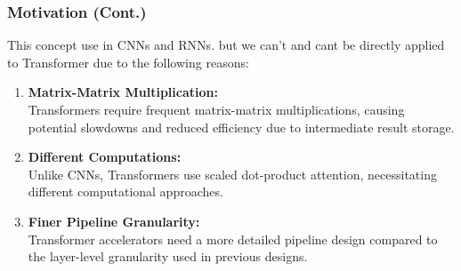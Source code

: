 \documentclass[
	12pt, %
]{beamer}
\begin{document}
\begin{frame}
	\frametitle{Motivation (Cont.)}
	
	This concept use in CNNs and RNNs. but we can't and cant be directly applied to Transformer due to the following reasons:
	
	\begin{enumerate}
		\item 
		\textbf{Matrix-Matrix Multiplication:}\\ 
		Transformers require frequent matrix-matrix multiplications, causing potential slowdowns and reduced efficiency due to intermediate result storage.
		
		\item 
		\textbf{Different Computations:}\\
		Unlike CNNs, Transformers use scaled dot-product attention, necessitating different computational approaches.
		 
		\item 
		\textbf{Finer Pipeline Granularity:}\\
		Transformer accelerators need a more detailed pipeline design compared to the layer-level granularity used in previous designs.
	\end{enumerate}
\end{frame}





\end{document}
